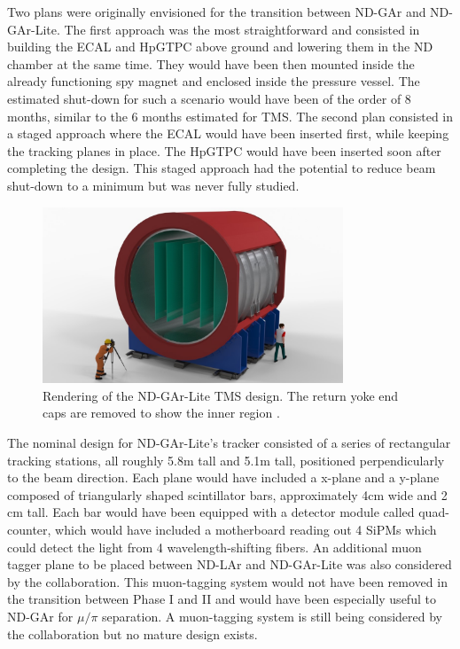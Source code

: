 Two plans were originally envisioned for the transition between ND-GAr and ND-GAr-Lite. The first approach was the most straightforward and consisted in building the ECAL and HpGTPC above ground and lowering them in the ND chamber at the same time. They would have been then mounted inside the already functioning spy magnet and enclosed inside the pressure vessel. The estimated shut-down for such a scenario would have been of the order of 8 months, similar to the 6 months estimated for TMS. The second plan consisted in a staged approach where the ECAL would have been inserted first, while keeping the tracking planes in place. The HpGTPC would have been inserted soon after completing the design. This staged approach had the potential to reduce beam shut-down to a minimum but was never fully studied.

\begin{figure}[t]
     \centering
     \includegraphics[width=0.8\textwidth]{figures/ch3-DUNE/MPD_Magnet_w_Tracker_Planes.jpg}
     \caption[Rendering of the ND-GAr-Lite TMS design]{Rendering of the ND-GAr-Lite TMS design. The return yoke end caps are removed to show the inner region \cite{ND-GAR-LiteCDR}.}
        \label{fig:Lite}
\end{figure}

The nominal design for ND-GAr-Lite’s tracker consisted of a series of rectangular tracking stations, all roughly 5.8m tall and 5.1m tall, positioned perpendicularly to the beam direction. Each plane would have included a x-plane and a y-plane composed of triangularly shaped scintillator bars, approximately 4cm wide and 2 cm tall. Each bar would have been equipped with a detector module called quad-counter, which would have included a motherboard reading out 4 SiPMs which could detect the light from 4 wavelength-shifting fibers. An additional muon tagger plane to be placed between ND-LAr and ND-GAr-Lite was also considered by the collaboration. This muon-tagging system would not have been removed in the transition between Phase I and II and would have been especially useful to ND-GAr for $\mu/\pi$ separation. A muon-tagging system is still being considered by the collaboration but no mature design exists.  

